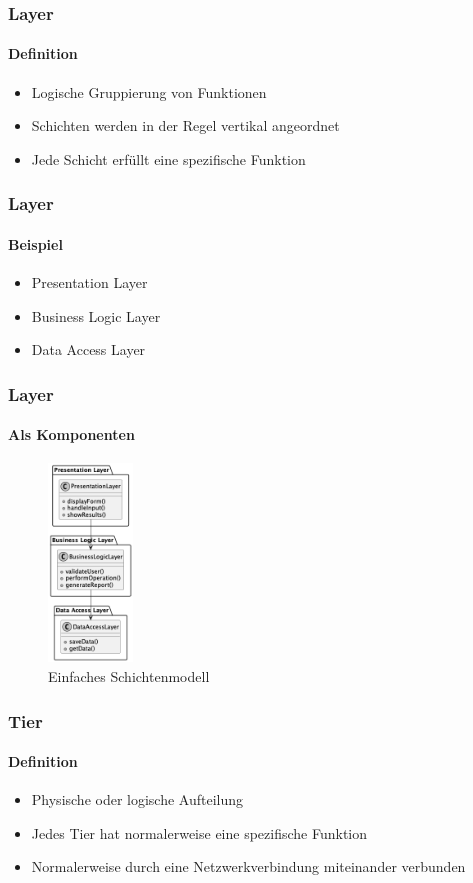 \begin{frame}
  \frametitle{Layer}
  \framesubtitle{Definition}
  \begin{itemize}
    \item Logische Gruppierung von Funktionen
    \item Schichten werden in der Regel vertikal angeordnet
    \item Jede Schicht erfüllt eine spezifische Funktion
  \end{itemize}
\end{frame}

\begin{frame}
  \frametitle{Layer}
  \framesubtitle{Beispiel}
  \begin{itemize}
    \item Presentation Layer
    \item Business Logic Layer
    \item Data Access Layer
  \end{itemize}
\end{frame}


\begin{frame}
  \frametitle{Layer}
  \framesubtitle{Als Komponenten}
  \begin{figure}[!h]
    \centering
    \includegraphics[width=0.20\textwidth]{fig/uml/simple-layers.png}
    \caption{Einfaches Schichtenmodell}
    \label{fig:simple-layer}
  \end{figure}
\end{frame}

\begin{frame}
  \frametitle{Tier}
  \framesubtitle{Definition}
  \begin{itemize}
    \item Physische oder logische Aufteilung
    \item Jedes Tier hat normalerweise eine spezifische Funktion 
    \item Normalerweise durch eine Netzwerkverbindung miteinander verbunden
  \end{itemize}
\end{frame}

